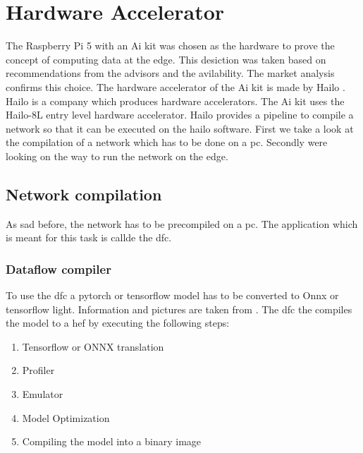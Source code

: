 \chapter{Hardware Accelerator}

The Raspberry Pi 5 with an Ai kit was chosen as the hardware to prove the concept of computing data at the edge.
This desiction was taken based on recommendations from the advisors and the avilability.
The market analysis confirms this choice.
The hardware accelerator of the Ai kit is made by Hailo \cite{hailo}.
Hailo is a company which produces hardware accelerators.
The Ai kit uses the Hailo-8L entry level hardware accelerator.
Hailo provides a pipeline to compile a network so that it can be executed on the hailo software.
First we take a look at the compilation of a network which has to be done on a pc.
Secondly were looking on the way to run the network on the edge.

\section{Network compilation}
As sad before, the network has to be precompiled on a pc.
The application which is meant for this task is callde the \Acrfull{dfc}.

\subsection{Dataflow compiler}

To use the \acrshort{dfc} a pytorch or tensorflow model has to be converted to Onnx or tensorflow light.
Information and pictures are taken from \cite{hailo_dataflow_compiler}.
The \acrshort{dfc} the compiles the model to a \Acrfull{hef} by executing the following steps:
\begin{enumerate}
    \item Tensorflow or ONNX translation
    \item Profiler
    \item Emulator
    \item Model Optimization
    \item Compiling the model into a binary image
\end{enumerate}



